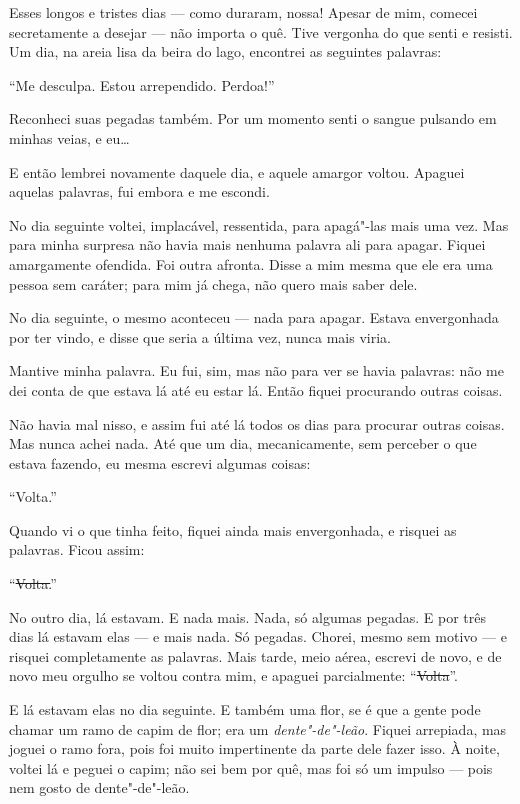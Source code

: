 Esses longos e tristes dias --- como duraram, nossa! Apesar de mim, comecei
secretamente a desejar --- não importa o quê. Tive vergonha do que
senti e resisti. Um dia, na areia lisa da beira do lago, encontrei as seguintes
palavras:

“Me desculpa. Estou arrependido. Perdoa!”

Reconheci suas pegadas também. Por um momento senti o sangue pulsando em minhas
veias, e eu\ldots{}

E então lembrei novamente daquele dia, e aquele amargor voltou. Apaguei aquelas
palavras, fui embora e me escondi.

No dia seguinte voltei, implacável, ressentida, para apagá"-las mais uma vez. Mas
para minha surpresa não havia mais nenhuma palavra ali para apagar. Fiquei amargamente ofendida.
Foi outra afronta. Disse a mim mesma que ele era uma pessoa sem caráter; para mim já chega, não
quero mais saber dele.

No dia seguinte, o mesmo aconteceu --- nada para apagar. Estava envergonhada
por ter vindo, e disse que seria a última vez, nunca mais viria.

Mantive minha palavra. Eu fui, sim, mas não para ver se havia palavras: não me
dei conta de que estava lá até eu estar lá. Então fiquei procurando outras coisas.

Não havia mal nisso, e assim fui até lá todos os dias para procurar outras coisas.
Mas nunca achei nada. Até que um dia, mecanicamente, sem perceber
o que estava fazendo, eu mesma escrevi algumas coisas:

“Volta.”

Quando vi o que tinha feito, fiquei ainda mais envergonhada, e risquei as
palavras. Ficou assim:

“\sout{Volta.}”

No outro dia, lá estavam. E nada mais. Nada, só algumas pegadas. E por três
dias lá estavam elas --- e mais nada. Só pegadas. Chorei, mesmo sem motivo --- 
e risquei completamente as palavras. Mais tarde, meio
aérea, escrevi de novo, e de novo meu orgulho se voltou contra mim, e
apaguei parcialmente: “\sout{Volta}”.

E lá estavam elas no dia seguinte. E também uma flor, se é que a gente pode chamar
um ramo de capim de flor; era um \textit{dente"-de"-leão}. Fiquei arrepiada, mas
joguei o ramo fora, pois foi muito impertinente da parte dele fazer isso. À noite,
voltei lá e peguei o capim; não sei bem por quê, mas foi só um impulso --- pois nem
gosto de dente"-de"-leão.

